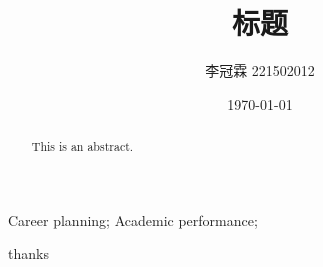 \documentclass[12pt, a4paper, oneside,UTF8]{ctexart}
\title{标题}
\author{李冠霖 221502012}
\date{\today}
\begin{document}
\begin{abstract}
    This is an abstract.
\end{abstract}

\maketitle
\tableofcontents
\newpage
\begin{keyword}
    Career planning;  %
    Academic performance;  %
\end{keyword}
\newpage
thanks \cite{negru2016longitudinal}



\end{document}
